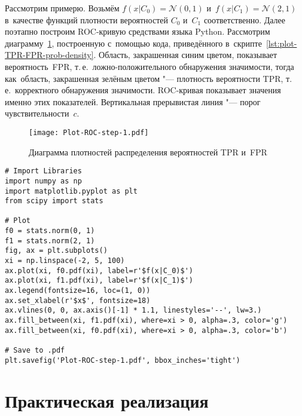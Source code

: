 \documentclass[]{scrreprt}
\begin{document}
Рассмотрим примерю. Возьмём  $f(x|C_{0}) = \mathcal{N}(0,1)$ и~$f(x|C_{1}) = \mathcal{N}(2,1)$ в~качестве функций плотности вероятностей $C_{0}$ и~$C_{1}$ соответственно. Далее поэтапно построим ROC-кривую средствами языка Python. Рассмотрим диаграмму~\ref{fig:plot-TPR-FPR-prob-density}, построенную с~помощью кода, приведённого в~скрипте~\ref{lst:plot-TPR-FPR-prob-density}. Область, закрашенная синим цветом, показывает вероятность~FPR, т.\,е.~ложно-положительного обнаружения значимости, тогда как~область, закрашенная зелёным цветом "--- плотность вероятности TPR, т.\,е.~корректного обнаружения значимости. ROC-кривая показывает значения именно этих показателей. Вертикальная прерывистая линия "--- порог чувствительности~$c$.

%
\begin{figure}[ht]
	\centering
	\texttt{[image: Plot-ROC-step-1.pdf]}
	\caption{Диаграмма плотностей распределения вероятностей TPR и~FPR}
	\label{fig:plot-TPR-FPR-prob-density}
\end{figure}
%
\begin{lstlisting}[float, caption = Построение диаграммы плотностей распределения вероятностей TPR и~FPR, firstnumber=1, label= lst:plot-TPR-FPR-prob-density]
# Import Libraries
import numpy as np
import matplotlib.pyplot as plt
from scipy import stats

# Plot
f0 = stats.norm(0, 1)
f1 = stats.norm(2, 1)
fig, ax = plt.subplots()
xi = np.linspace(-2, 5, 100)
ax.plot(xi, f0.pdf(xi), label=r'$f(x|C_0)$')
ax.plot(xi, f1.pdf(xi), label=r'$f(x|C_1)$')
ax.legend(fontsize=16, loc=(1, 0))
ax.set_xlabel(r'$x$', fontsize=18)
ax.vlines(0, 0, ax.axis()[-1] * 1.1, linestyles='--', lw=3.)
ax.fill_between(xi, f1.pdf(xi), where=xi > 0, alpha=.3, color='g')
ax.fill_between(xi, f0.pdf(xi), where=xi > 0, alpha=.3, color='b')

# Save to .pdf
plt.savefig('Plot-ROC-step-1.pdf', bbox_inches='tight')
\end{lstlisting}
% 

\clearpage

\chapter{Практическая реализация}\label{U-test-practice}
\end{document}
